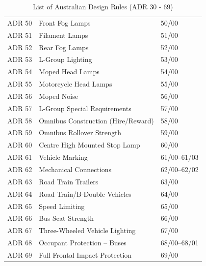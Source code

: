 \begin{table}[h]
\begin{tabularx}{\textwidth}{|c|X|X|}
            ADR 50 & Front Fog Lamps & 50/00 \\
            ADR 51 & Filament Lamps & 51/00 \\
            ADR 52 & Rear Fog Lamps & 52/00 \\
            ADR 53 & L-Group Lighting & 53/00 \\
            ADR 54 & Moped Head Lamps & 54/00 \\
            ADR 55 & Motorcycle Head Lamps & 55/00 \\
            ADR 56 & Moped Noise & 56/00 \\
            ADR 57 & L-Group Special Requirements & 57/00 \\
            ADR 58 & Omnibus Construction (Hire/Reward) & 58/00 \\
            ADR 59 & Omnibus Rollover Strength & 59/00 \\
            
            ADR 60 & Centre High Mounted Stop Lamp & 60/00 \\
            ADR 61 & Vehicle Marking & 61/00–61/03 \\
            ADR 62 & Mechanical Connections & 62/00–62/02 \\
            ADR 63 & Road Train Trailers & 63/00 \\
            ADR 64 & Road Train/B-Double Vehicles & 64/00 \\
            ADR 65 & Speed Limiting & 65/00 \\
            ADR 66 & Bus Seat Strength & 66/00 \\
            ADR 67 & Three-Wheeled Vehicle Lighting & 67/00 \\
            ADR 68 & Occupant Protection – Buses & 68/00–68/01 \\
            
            ADR 69 & Full Frontal Impact Protection & 69/00 \\
            
            \hline
            \end{tabularx}
            \caption{List of Australian Design Rules (ADR 30 - 69)}
            \label{tab:adr2}
        \end{table}
    
    \newpage
